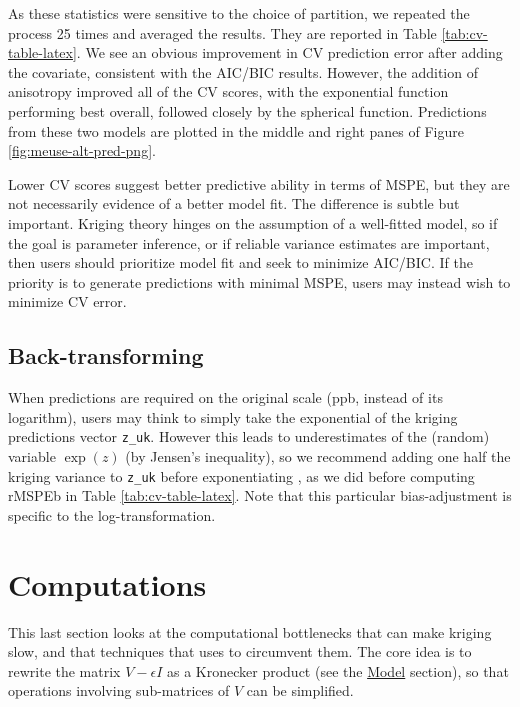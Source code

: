 As these statistics were sensitive to the choice of partition, we repeated the process 25 times and averaged the results. They are reported in Table
\ref{tab:cv-table-latex}.
We see an obvious improvement in CV prediction error after adding the covariate, consistent with the AIC/BIC results. However, the addition of anisotropy improved all of the CV scores, with the exponential function performing best overall, followed closely by the spherical function. Predictions from these two models are plotted in the middle and right panes of Figure \ref{fig:meuse-alt-pred-png}.

Lower CV scores suggest better predictive ability in terms of MSPE, but they are not necessarily evidence of a better model fit. The difference is subtle but important. Kriging theory hinges on the assumption of a well-fitted model, so if the goal is parameter inference, or if reliable variance estimates are important, then users should prioritize model fit and seek to minimize AIC/BIC. If the priority is to generate predictions with minimal MSPE, users may instead wish to minimize CV error.

\hypertarget{back-transforming}{%
\subsection{Back-transforming}\label{back-transforming}}

When predictions are required on the original scale (ppb, instead of its logarithm), users may think to simply take the exponential of the kriging predictions vector \texttt{z\_uk}. However this leads to underestimates of the (random) variable \(\exp(z)\) (by Jensen's inequality), so we recommend adding one half the kriging variance to \texttt{z\_uk} before exponentiating \citep{cressie2015statistics}, as we did before computing rMSPEb in Table \ref{tab:cv-table-latex}. Note that this particular bias-adjustment is specific to the log-transformation.

\hypertarget{computations}{%
\section{Computations}\label{computations}}

This last section looks at the computational bottlenecks that can make kriging slow, and that techniques that  uses to circumvent them. The core idea is to rewrite the matrix \(V - \epsilon I\) as a Kronecker product (see the \protect\hyperlink{model}{Model} section), so that operations involving sub-matrices of \(V\) can be simplified.

